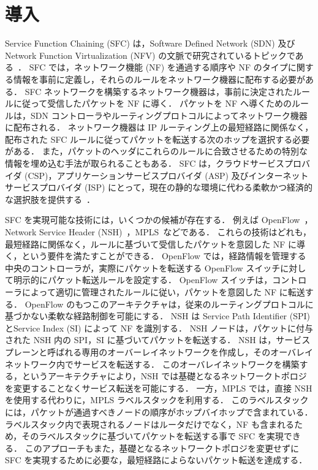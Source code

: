 \section{導入}
\label{section:background}
Service Function Chaining (SFC) は，Software Defined Network (SDN) 及び Network Function Virtualization (NFV) の文脈で研究されているトピックである~\cite{nfv,sfc-on-sdn-nfv-servey,sfc-on-sdn-scenario,imple-sfc-with-openflow}．
SFC では，ネットワーク機能 (NF) を通過する順序や NF のタイプに関する情報を事前に定義し，それらのルールをネットワーク機器に配布する必要がある．
SFC ネットワークを構築するネットワーク機器は，事前に決定されたルールに従って受信したパケットを NF に導く．
パケットを NF へ導くためのルールは，SDN コントローラやルーティングプロトコルによってネットワーク機器に配布される．
ネットワーク機器は IP ルーティング上の最短経路に関係なく，配布された SFC ルールに従ってパケットを転送する次のホップを選択する必要がある．
また，パケットのヘッダにこれらのルールに合致させるための特別な情報を埋め込む手法が取られることもある．
SFC は，クラウドサービスプロバイダ (CSP)，アプリケーションサービスプロバイダ (ASP) 及びインターネットサービスプロバイダ (ISP) にとって，現在の静的な環境に代わる柔軟かつ経済的な選択肢を提供する~\cite{survey-on-sfc}．

SFC を実現可能な技術には，いくつかの候補が存在する．
例えば OpenFlow~\cite{openflow}，Network Service Header (NSH)~\cite{rfc8300}，MPLS~\cite{rfc8595}などである．
これらの技術はどれも，最短経路に関係なく，ルールに基づいて受信したパケットを意図した NF に導く，という要件を満たすことができる．
OpenFlow では，経路情報を管理する中央のコントローラが，実際にパケットを転送する OpenFlow スイッチに対して明示的にパケット転送ルールを設定する．
OpenFlow スイッチは，コントローラによって適切に管理されたルールに従い，パケットを意図した NF に転送する．
OpenFlow のもつこのアーキテクチャは，従来のルーティングプロトコルに基づかない柔軟な経路制御を可能にする．
NSH は Service Path Identifier (SPI) とService Index (SI) によって NF を識別する．
NSH ノードは，パケットに付与された NSH 内の SPI，SI に基づいてパケットを転送する．
NSH は，サービスプレーンと呼ばれる専用のオーバーレイネットワークを作成し，そのオーバレイネットワーク内でサービスを転送する．
このオーバレイネットワークを構築する，というアーキテクチャにより，NSH では基礎となるネットワークトポロジを変更することなくサービス転送を可能にする．
一方，MPLS では，直接 NSH を使用する代わりに，MPLS ラベルスタックを利用する．
このラベルスタックには，パケットが通過すべきノードの順序がホップバイホップで含まれている．
ラベルスタック内で表現されるノードはルータだけでなく，NF も含まれるため，そのラベルスタックに基づいてパケットを転送する事で SFC を実現できる．
このアプローチもまた，基礎となるネットワークトポロジを変更せずに SFC を実現するために必要な，最短経路によらないパケット転送を達成する．

